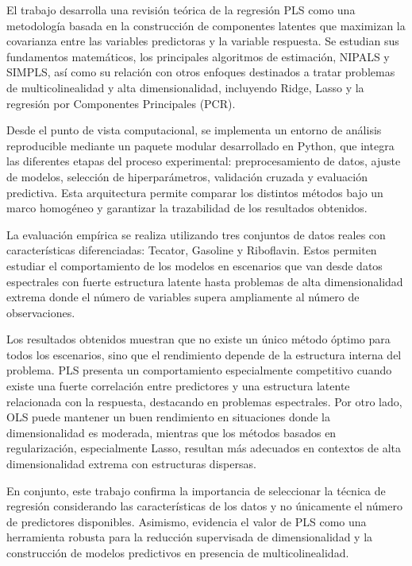 \documentclass[12pt,a4paper]{report}
\begin{document}
El trabajo desarrolla una revisión teórica de la regresión PLS como una metodología basada en la construcción de componentes latentes que maximizan la covarianza entre las variables predictoras y la variable respuesta. Se estudian sus fundamentos matemáticos, los principales algoritmos de estimación, NIPALS y SIMPLS, así como su relación con otros enfoques destinados a tratar problemas de multicolinealidad y alta dimensionalidad, incluyendo Ridge, Lasso y la regresión por Componentes Principales (PCR).

Desde el punto de vista computacional, se implementa un entorno de análisis reproducible mediante un paquete modular desarrollado en Python, que integra las diferentes etapas del proceso experimental: preprocesamiento de datos, ajuste de modelos, selección de hiperparámetros, validación cruzada y evaluación predictiva. Esta arquitectura permite comparar los distintos métodos bajo un marco homogéneo y garantizar la trazabilidad de los resultados obtenidos.

La evaluación empírica se realiza utilizando tres conjuntos de datos reales con características diferenciadas: Tecator, Gasoline y Riboflavin. Estos permiten estudiar el comportamiento de los modelos en escenarios que van desde datos espectrales con fuerte estructura latente hasta problemas de alta dimensionalidad extrema donde el número de variables supera ampliamente al número de observaciones.

Los resultados obtenidos muestran que no existe un único método óptimo para todos los escenarios, sino que el rendimiento depende de la estructura interna del problema. PLS presenta un comportamiento especialmente competitivo cuando existe una fuerte correlación entre predictores y una estructura latente relacionada con la respuesta, destacando en problemas espectrales. Por otro lado, OLS puede mantener un buen rendimiento en situaciones donde la dimensionalidad es moderada, mientras que los métodos basados en regularización, especialmente Lasso, resultan más adecuados en contextos de alta dimensionalidad extrema con estructuras dispersas.

En conjunto, este trabajo confirma la importancia de seleccionar la técnica de regresión considerando las características de los datos y no únicamente el número de predictores disponibles. Asimismo, evidencia el valor de PLS como una herramienta robusta para la reducción supervisada de dimensionalidad y la construcción de modelos predictivos en presencia de multicolinealidad.
\end{document}
